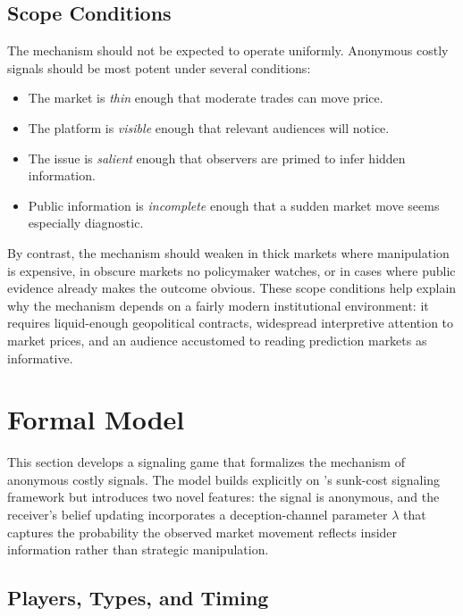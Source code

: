\documentclass[12pt]{article}
\begin{document}
\subsection{Scope Conditions}

The mechanism should not be expected to operate uniformly. Anonymous costly signals should be most potent under several conditions:
\begin{itemize}
    \item The market is \textit{thin} enough that moderate trades can move price.
    \item The platform is \textit{visible} enough that relevant audiences will notice.
    \item The issue is \textit{salient} enough that observers are primed to infer hidden information.
    \item Public information is \textit{incomplete} enough that a sudden market move seems especially diagnostic.
\end{itemize}

By contrast, the mechanism should weaken in thick markets where manipulation is expensive, in obscure markets no policymaker watches, or in cases where public evidence already makes the outcome obvious. These scope conditions help explain why the mechanism depends on a fairly modern institutional environment: it requires liquid-enough geopolitical contracts, widespread interpretive attention to market prices, and an audience accustomed to reading prediction markets as informative.


\section{Formal Model}\label{sec:model}

This section develops a signaling game that formalizes the mechanism of anonymous costly signals. The model builds explicitly on \citet{fearon1997}'s sunk-cost signaling framework but introduces two novel features: the signal is anonymous, and the receiver's belief updating incorporates a deception-channel parameter $\lambda$ that captures the probability the observed market movement reflects insider information rather than strategic manipulation.

\subsection{Players, Types, and Timing}
\end{document}
